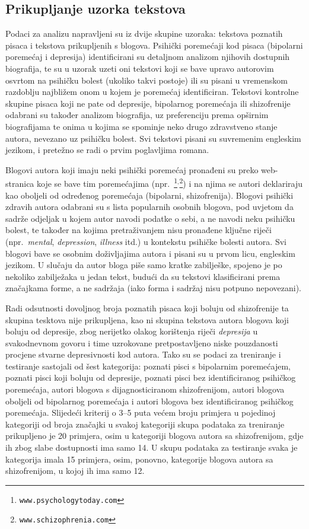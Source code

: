 \documentclass[10pt, a4paper]{article}
\begin{document}
\subsection{Prikupljanje uzorka tekstova}

Podaci za analizu napravljeni su iz dvije skupine uzoraka: tekstova poznatih pisaca i tekstova prikupljenih s blogova. Psihički poremećaji kod pisaca (bipolarni poremećaj i depresija) identificirani su detaljnom analizom njihovih dostupnih biografija, te su u uzorak uzeti oni tekstovi koji se bave upravo autorovim osvrtom na psihičku bolest (ukoliko takvi postoje) ili su pisani u vremenskom razdoblju najbližem onom u kojem je poremećaj identificiran. Tekstovi kontrolne skupine pisaca koji ne pate od depresije, bipolarnog poremećaja ili shizofrenije odabrani su također analizom biografija, uz preferenciju prema opširnim biografijama te onima u kojima se spominje neko drugo zdravstveno stanje autora, nevezano uz psihičku bolest. Svi tekstovi pisani su suvremenim engleskim jezikom, i pretežno se radi o prvim poglavljima romana.

Blogovi autora koji imaju neki psihički poremećaj pronađeni su preko web-stranica koje se bave tim poremećajima (npr.~\footnote{\texttt{www.psychologytoday.com}}$^,$\footnote{\texttt{www.schizophrenia.com}}) i na njima se autori deklariraju kao oboljeli od određenog poremećaja (bipolarni, shizofrenija). Blogovi psihički zdravih autora odabrani su s lista popularnih osobnih blogova, pod uvjetom da sadrže odjeljak u kojem autor navodi podatke o sebi, a ne navodi neku psihičku bolest, te također na kojima pretraživanjem nisu pronađene ključne riječi (npr.~\emph{mental}, \emph{depression}, \emph{illness} itd.) u kontekstu psihičke bolesti autora. Svi blogovi bave se osobnim doživljajima autora i pisani su u prvom licu, engleskim jezikom. U slučaju da autor bloga piše samo kratke zabilješke, spojeno je po nekoliko zabilježaka u jedan tekst, budući da su tekstovi klasificirani prema značajkama forme, a ne sadržaja (iako forma i sadržaj nisu potpuno nepovezani).

Radi odsutnosti dovoljnog broja poznatih pisaca koji boluju od shizofrenije ta skupina tesktova nije prikupljena, kao ni skupina tekstova autora blogova koji boluju od depresije, zbog nerijetko olakog korištenja riječi \emph{depresija} u svakodnevnom govoru i time uzrokovane pretpostavljeno niske pouzdanosti procjene stvarne depresivnosti kod autora. Tako su se podaci za treniranje i testiranje sastojali od šest kategorija: poznati pisci s bipolarnim poremećajem, poznati pisci koji boluju od depresije, poznati pisci bez identificiranog psihičkog poremećaja, autori blogova s dijagnosticiranom shizofrenijom, autori blogova oboljeli od bipolarnog poremećaja i autori blogova bez identificiranog psihičkog poremećaja. Slijedeći kriterij o 3--5 puta većem broju primjera u pojedinoj kategoriji od broja značajki \citep{ribaric} u svakoj kategoriji skupa podataka za treniranje prikupljeno je 20 primjera, osim u kategoriji blogova autora sa shizofrenijom, gdje ih zbog slabe dostupnosti ima samo 14. U skupu podataka za testiranje svaka je kategorija imala 15 primjera, osim, ponovno, kategorije blogova autora sa shizofrenijom, u kojoj ih ima samo 12. 
\end{document}
